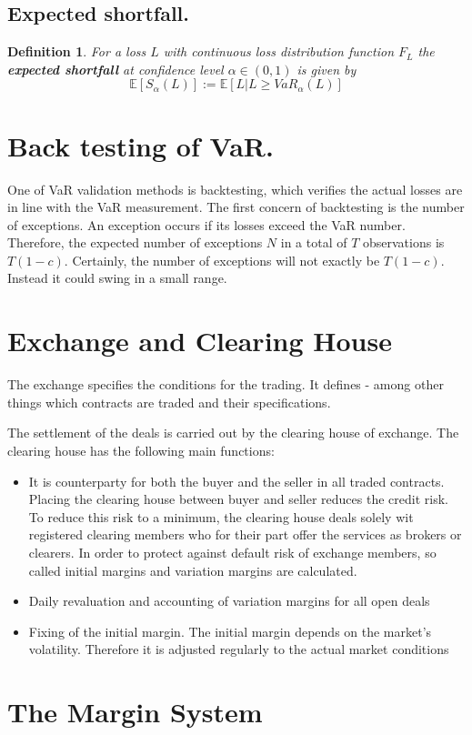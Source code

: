 \documentclass{book}
\newtheorem{definition}{Definition}[section]
\begin{document}
\subsection{Expected shortfall.}
\begin{definition}
For a loss $L$ with continuous loss distribution function $F_{L}$ the \textbf{expected shortfall} at confidence level $\alpha\in(0,1)$ is given by
$$
\mathbb{E}[S_{\alpha}(L)]:=\mathbb{E}[L|L\geq VaR_{\alpha}(L)]
$$
\end{definition}
\section{Back testing of VaR.}
One of VaR validation methods is backtesting, which verifies the actual losses are in line with the VaR measurement. The first concern of backtesting is the number of exceptions. An exception occurs if its losses exceed the VaR number. Therefore, the expected number of exceptions $N$ in a total of $T$ observations is $T(1-c)$. Certainly, the number of exceptions will not exactly be $T(1-c).$ Instead it could swing in a small range. 
\section{Exchange and Clearing House}
The exchange specifies the conditions for the trading. It defines - among other things which contracts are traded and their specifications.

The settlement of the deals is carried out by the clearing house of exchange. The clearing house has the following main functions:
\begin{itemize}
\item It is counterparty for both the buyer and the seller in all traded contracts. Placing the clearing house between buyer and seller reduces the credit risk. To reduce this risk to a minimum, the clearing house deals solely wit registered clearing members who for their part offer the services as brokers or clearers. In order to protect against default risk of exchange members, so called initial margins and variation margins are calculated.
\item Daily revaluation and accounting of variation margins for all open deals
\item Fixing of the initial margin. The initial margin depends on the market's volatility. Therefore it is adjusted regularly to the actual market conditions
\end{itemize}
\section{The Margin System}
\end{document}
